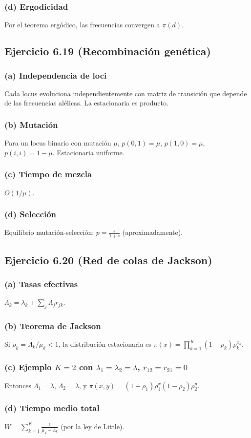 \documentclass[12pt]{article}
\newcommand{\1}{\mathbf{1}}
\begin{document}
\subsubsection*{(d) Ergodicidad}
Por el teorema erg\'odico, las frecuencias convergen a $\pi(d)$.

\subsection{Ejercicio 6.19 (Recombinaci\'on gen\'etica)}

\subsubsection*{(a) Independencia de loci}
Cada locus evoluciona independientemente con matriz de transici\'on que depende de las frecuencias al\'elicas. La estacionaria es producto.

\subsubsection*{(b) Mutaci\'on}
Para un locus binario con mutaci\'on $\mu$, $p(0,1)=\mu$, $p(1,0)=\mu$, $p(i,i)=1-\mu$. Estacionaria uniforme.

\subsubsection*{(c) Tiempo de mezcla}
$O(1/\mu)$.

\subsubsection*{(d) Selecci\'on}
Equilibrio mutación-selección: $p=\frac{s}{1+s}$ (aproximadamente).

\subsection{Ejercicio 6.20 (Red de colas de Jackson)}

\subsubsection*{(a) Tasas efectivas}
$\Lambda_k=\lambda_k+\sum_j\Lambda_j r_{jk}$.

\subsubsection*{(b) Teorema de Jackson}
Si $\rho_k=\Lambda_k/\mu_k<1$, la distribuci\'on estacionaria es $\pi(x)=\prod_{k=1}^K(1-\rho_k)\rho_k^{x_k}$.

\subsubsection*{(c) Ejemplo $K=2$ con $\lambda_1=\lambda_2=\lambda$, $r_{12}=r_{21}=0$}
Entonces $\Lambda_1=\lambda$, $\Lambda_2=\lambda$, y $\pi(x,y)=(1-\rho_1)\rho_1^x(1-\rho_2)\rho_2^y$.

\subsubsection*{(d) Tiempo medio total}
$W=\sum_{k=1}^K\frac{1}{\mu_k-\Lambda_k}$ (por la ley de Little).
\end{document}
